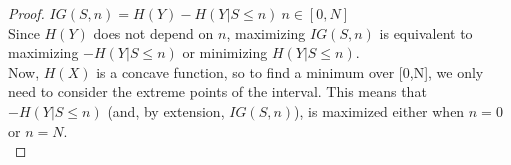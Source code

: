 \documentclass[12pt]{article}
\begin{document}
\begin{enumerate}
\begin{proof}
      $IG(S,n)=H(Y)-H(Y|S\leq n)\ n\in[0,N]$\\

      Since $H(Y)$ does not depend on $n$, maximizing $IG(S,n)$ is
      equivalent to maximizing $-H(Y|S\leq n)$ or minimizing $H(Y|S\leq n)$.\\

      Now, $H(X)$ is a concave function, so to find a minimum over [0,N], we only
      need to consider the extreme points of the interval. This means that
      $-H(Y|S\leq n)$ (and, by extension, $IG(S,n)$), is maximized either when
      $n=0$ or $n=N$.\\
    \end{proof}
\end{enumerate}
\end{document}
